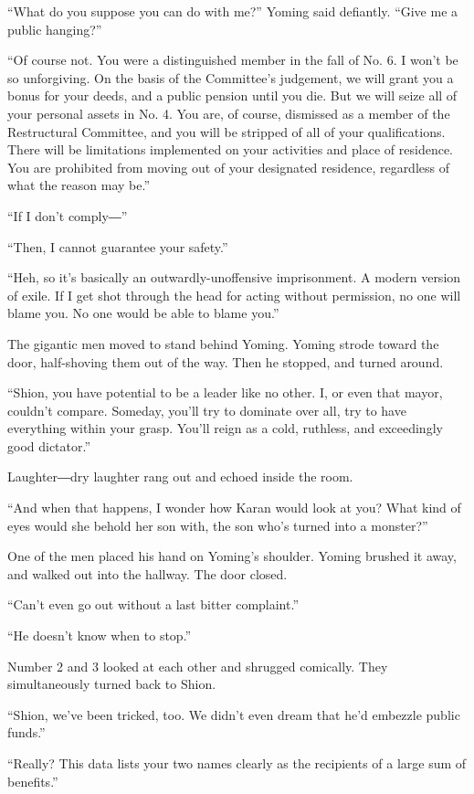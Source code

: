 ``What do you suppose you can do with me?'' Yoming said defiantly.
``Give me a public hanging?''

``Of course not. You were a distinguished member in the fall of No. 6. I
won't be so unforgiving. On the basis of the Committee's judgement, we
will grant you a bonus for your deeds, and a public pension until you
die. But we will seize all of your personal assets in No. 4. You are, of
course, dismissed as a member of the Restructural Committee, and you
will be stripped of all of your qualifications. There will be
limitations implemented on your activities and place of residence. You
are prohibited from moving out of your designated residence, regardless
of what the reason may be.''

``If I don't comply―''

``Then, I cannot guarantee your safety.''

``Heh, so it's basically an outwardly-unoffensive imprisonment. A modern
version of exile. If I get shot through the head for acting without
permission, no one will blame you. No one would be able to blame you.''

The gigantic men moved to stand behind Yoming. Yoming strode toward the
door, half-shoving them out of the way. Then he stopped, and turned
around.

``Shion, you have potential to be a leader like no other. I, or even
that mayor, couldn't compare. Someday, you'll try to dominate over all,
try to have everything within your grasp. You'll reign as a cold,
ruthless, and exceedingly good dictator.''

Laughter―dry laughter rang out and echoed inside the room.

``And when that happens, I wonder how Karan would look at you? What kind
of eyes would she behold her son with, the son who's turned into a
monster?''

One of the men placed his hand on Yoming's shoulder. Yoming brushed it
away, and walked out into the hallway. The door closed.

``Can't even go out without a last bitter complaint.''

``He doesn't know when to stop.''

Number 2 and 3 looked at each other and shrugged comically. They
simultaneously turned back to Shion.

``Shion, we've been tricked, too. We didn't even dream that he'd
embezzle public funds.''

``Really? This data lists your two names clearly as the recipients of a
large sum of benefits.''

